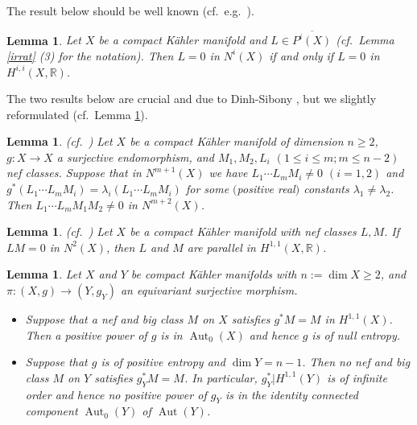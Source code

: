 \documentclass[11pt,a4paper,psamsfonts]{amsart}
\theoremstyle{plain}
\newtheorem{lemma}[thm]{Lemma}
\theoremstyle{definition}
\theoremstyle{remark}
\begin{document}
The result below should be well known (cf.~e.g.~\cite[Appendix, Lemma A.4]{NZ}).

\begin{lemma}\label{comp0}
Let $X$ be a compact K\"ahler manifold and $L \in \overline{P^i(X)}$ 
{\rm (cf.~Lemma \ref{irrat} (3) for the notation)}.
Then $L = 0$ in $N^i(X)$ if and only if $L = 0$ in $H^{i,i}(X, {\mathbb{R}})$.
\end{lemma}

The two results below are crucial and due to Dinh-Sibony \cite{DS}, but we slightly reformulated
(cf.~Lemma \ref{comp0}).

\begin{lemma} {\rm(cf.~\cite[Lemme 4.4]{DS})} \label{DSl}
Let $X$ be a compact K\"ahler manifold of dimension $n \ge 2$,
$g : X \to X$ a surjective endomorphism, and $M_1, M_2, L_i$ $(1 \le i \le m; m \le n-2)$
nef classes. Suppose that in $N^{m+1}(X)$ we have $L_1 \cdots L_m M_i \ne 0$ $(i = 1, 2)$
and $g^*(L_1 \cdots L_m M_i) = \lambda_i (L_1 \cdots L_m M_i)$ for some $($positive real$)$
constants $\lambda_1 \ne \lambda_2$. Then $L_1 \cdots L_m M_1 M_2 \ne 0$
in $N^{m+2}(X)$.
\end{lemma}

\begin{lemma}{\rm(cf.~\cite[Corollaire 3.2]{DS})} \label{DSc}
Let $X$ be a compact K\"ahler manifold with nef classes $L, M$.
If $L M = 0$ in $N^2(X)$, then $L$ and $M$ are parallel in $H^{1, 1}(X, {\mathbb{R}})$.
\end{lemma}

\begin{lemma}\label{n-1}
Let $X$ and $Y$ be compact K\"ahler manifolds with $n:= \dim X \ge 2$,
and $\pi : (X, g) \to (Y, g_Y)$ an equivariant surjective morphism.
\begin{itemize}
\item[(1)]
Suppose that a nef and big class $M$ on $X$ satisfies $g^*M = M$ in $H^{1,1}(X)$.
Then a positive power of $g$ is in ${\operatorname{Aut}}_0(X)$ and hence
$g$ is of null entropy.
\item[(2)]
Suppose that $g$ is of positive entropy and $\dim Y = n-1$.
Then no nef and big class $M$ on $Y$ satisfies $g_Y^*M = M$.
In particular, $g_Y^* | H^{1,1}(Y)$ is of infinite order
and hence no positive power of $g_Y$ is in the identity
connected component ${\operatorname{Aut}}_0(Y)$ of ${\operatorname{Aut}}(Y)$.
\end{itemize}
\end{lemma}
\end{document}
